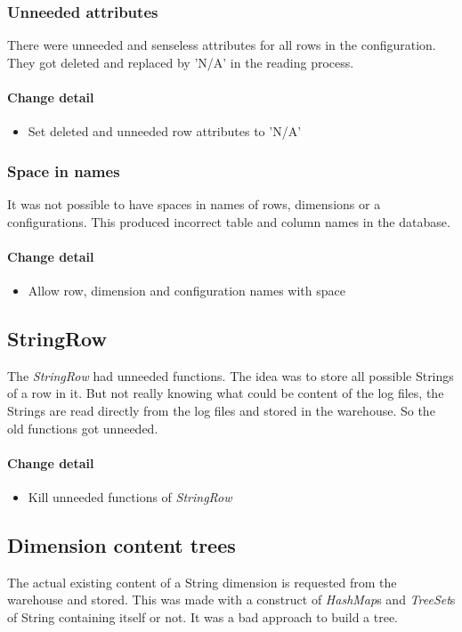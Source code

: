 \subsubsection{Unneeded attributes}
There were unneeded and senseless attributes for all rows in the configuration.
They got deleted and replaced by 'N/A' in the reading process.

\paragraph{Change detail}
\begin{itemize}
  \item Set deleted and unneeded row attributes to 'N/A'
\end{itemize}

\subsubsection{Space in names}
It was not possible to have spaces in names of rows, dimensions or a configurations. This
produced incorrect table and column names in the database.
\paragraph{Change detail}
\begin{itemize}
  \item Allow row, dimension and configuration names with space
\end{itemize}

\subsection{StringRow}
The \textit{StringRow} had unneeded functions. The idea was
to store all possible Strings of a row in it. But not really knowing what
could be content of the log files, the Strings are read directly from 
the log files and stored in the warehouse. So the old functions got unneeded.

\paragraph{Change detail}
\begin{itemize}
  \item Kill unneeded functions of \textit{StringRow}
\end{itemize}

\subsection{Dimension content trees}
The actual existing content of a String dimension is requested from
the warehouse and stored. This was made with a construct
of \textit{HashMap}s and \textit{TreeSet}s of String containing itself or not. It was
a bad approach to build a tree.

